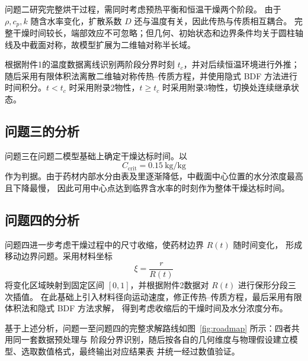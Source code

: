 \documentclass[12pt,a4paper]{ctexart}
\begin{document}
问题二研究完整烘干过程，需同时考虑预热平衡和恒温干燥两个阶段。
由于 $\rho,c_p,k$ 随含水率变化，扩散系数 $D$ 还与温度有关，因此传热与传质相互耦合。
完整干燥时间较长，端部效应不可忽略；但几何、初始状态和边界条件均关于圆柱轴线及中截面对称，故模型扩展为二维轴对称半长域。

根据附件1的温度数据离线识别两阶段分界时刻 $t_c$，并对后续恒温环境进行外推；随后采用有限体积法离散二维轴对称传热--传质方程，并使用隐式 BDF 方法进行时间积分。$t<t_c$ 时采用附录2物性，$t\ge t_c$ 时采用附录3物性，切换处连续继承状态。

\subsection{问题三的分析}

问题三在问题二模型基础上确定干燥达标时间。以
\[
C_{\mathrm{crit}}=0.15\ \mathrm{kg/kg}
\]
作为判据。由于药材内部水分由表及里逐渐降低，中截面中心位置的水分浓度最高且下降最慢，
因此可用中心点达到临界含水率的时刻作为整体干燥达标时间。

\subsection{问题四的分析}

问题四进一步考虑干燥过程中的尺寸收缩，使药材边界 $R(t)$ 随时间变化，
形成移动边界问题。采用材料坐标
\[
\xi=\frac{r}{R(t)}
\]
将变化区域映射到固定区间 $[0,1]$，并根据附件2数据对 $R(t)$ 进行保形分段三次插值。
在此基础上引入材料径向运动速度，修正传热--传质方程，最后采用有限体积法和隐式 BDF 方法求解，
得到考虑收缩后的干燥时间及水分浓度分布。



基于上述分析，问题一至问题四的完整求解路线如图~\ref{fig:roadmap} 所示：四者共用同一套数据预处理与
阶段分界识别，随后按各自的几何维度与物理假设建立模型、选取数值格式，最终输出对应结果表
并统一经过数值验证。
\end{document}
